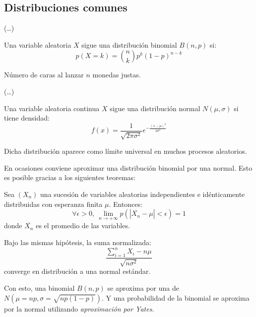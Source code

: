 \documentclass[10pt]{article}
\begin{document}
\subsection{Distribuciones comunes}

(\dots)

\begin{definition}
  Una variable aleatoria $X$ sigue una distribución binomial $B(n,p)$ si:
  \[ p(X = k) = \binom{n}{k} p^k (1-p)^{n-k} \]
\end{definition}

\begin{example}
  Número de caras al lanzar $ n $ monedas justas.
\end{example}

(\dots)

\begin{definition}
  Una variable aleatoria continua $X$ sigue una distribución normal $ N(\mu, \sigma) $ si tiene densidad:
  \[ f(x) = \frac{1}{\sqrt{2\pi\sigma^2}} e^{-\frac{(x-\mu)^2}{2\sigma^2}} \]
\end{definition}

\begin{remark}
  Dicha distribución aparece como límite universal en muchos procesos aleatorios.
\end{remark}

En ocasiones conviene aproximar una distribución binomial por una normal. Esto es posible gracias a los siguientes teoremas:

\begin{theorem}
  Sea $(X_n)$ una sucesión de variables aleatorias independientes e idénticamente distribuidas con esperanza finita $ \mu $.
  Entonces:
  \[ \forall \epsilon > 0,\ \lim_{n \to +\infty} p(| \overline{X_n} - \mu | < \epsilon) = 1 \]
  donde $ \overline{X_n} $ es el promedio de las variables.
\end{theorem}

\begin{theorem}
  Bajo las mismas hipótesis, la suma normalizada:
  \[ \frac{\sum_{i=1}^n X_i - n\mu}{\sqrt{n\sigma^2}} \]
  converge en distribución a una normal estándar.
\end{theorem}

Con esto, una binomial $ B(n, p) $ se aproxima por una de $ N(\mu = np, \sigma = \sqrt{np(1-p)}) $. Y una probabilidad de la binomial se aproxima
por la normal utilizando \textit{aproximación por Yates}.
\end{document}
